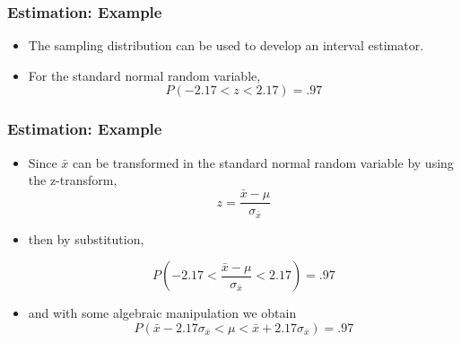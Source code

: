 \begin{frame}[fragile]\frametitle{Estimation: Example}
\begin{itemize}
\item The sampling distribution can be used to develop an interval estimator.

\item For the standard normal random variable,
$$P(-2.17 < z < 2.17) = .97 $$

\end{itemize}

\end{frame}

\begin{frame}[fragile]\frametitle{Estimation: Example}
\begin{itemize}
\item Since $\bar{x}$ can be transformed in the standard normal random variable by using the z-transform,
$$ z = \frac{\bar{x} - \mu}{\sigma_{\bar{x}}}$$

\item then by substitution,

$$P(-2.17 < \frac{\bar{x} - \mu}{\sigma_{\bar{x}}} < 2.17) = .97 $$

\item and with some algebraic manipulation we obtain
$$P(\bar{x} -2.17 \sigma_{\bar{x}} <  \mu <\bar{x} + 2.17 \sigma_{\bar{x}}) = .97 $$

\end{itemize}

\end{frame}

%
%
%
%
%

